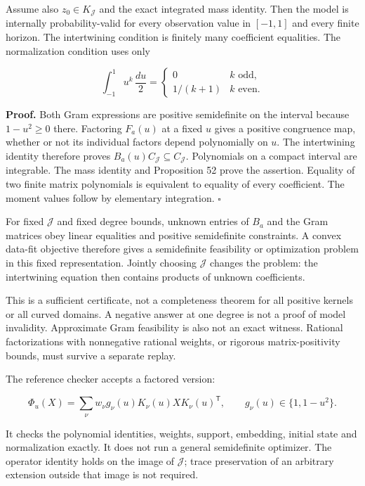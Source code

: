 Assume also \(z_0\in K_{\mathcal J}\) and the exact integrated mass
identity. Then the model is internally probability-valid for every
observation value in \([-1,1]\) and every finite horizon. The
intertwining condition is finitely many coefficient equalities. The
normalization condition uses only

\[
\int_{-1}^1u^k\,\frac{du}{2}
=\begin{cases}0&k\text{ odd},\\1/(k+1)&k\text{ even}.\end{cases}
\]

\textbf{Proof.} Both Gram expressions are positive semidefinite on the
interval because \(1-u^2\geq0\) there. Factoring \(F_a(u)\) at a fixed
\(u\) gives a positive congruence map, whether or not its individual
factors depend polynomially on \(u\). The intertwining identity
therefore proves \(B_a(u)C_{\mathcal J}\subseteq C_{\mathcal J}\).
Polynomials on a compact interval are integrable. The mass identity and
Proposition 52 prove the assertion. Equality of two finite matrix
polynomials is equivalent to equality of every coefficient. The moment
values follow by elementary integration. \(\square\)

For fixed \(\mathcal J\) and fixed degree bounds, unknown entries of
\(B_a\) and the Gram matrices obey linear equalities and positive
semidefinite constraints. A convex data-fit objective therefore gives a
semidefinite feasibility or optimization problem in this fixed
representation. Jointly choosing \(\mathcal J\) changes the problem: the
intertwining equation then contains products of unknown coefficients.

This is a sufficient certificate, not a completeness theorem for all
positive kernels or all curved domains. A negative answer at one degree
is not a proof of model invalidity. Approximate Gram feasibility is also
not an exact witness. Rational factorizations with nonnegative rational
weights, or rigorous matrix-positivity bounds, must survive a separate
replay.

The reference checker accepts a factored version:

\[
\Phi_u(X)=\sum_\nu w_\nu g_\nu(u)K_\nu(u)XK_\nu(u)^{\mathsf T},
\qquad g_\nu(u)\in\{1,1-u^2\}.
\]

It checks the polynomial identities, weights, support, embedding,
initial state and normalization exactly. It does not run a general
semidefinite optimizer. The operator identity holds on the image of
\(\mathcal J\); trace preservation of an arbitrary extension outside
that image is not required.

